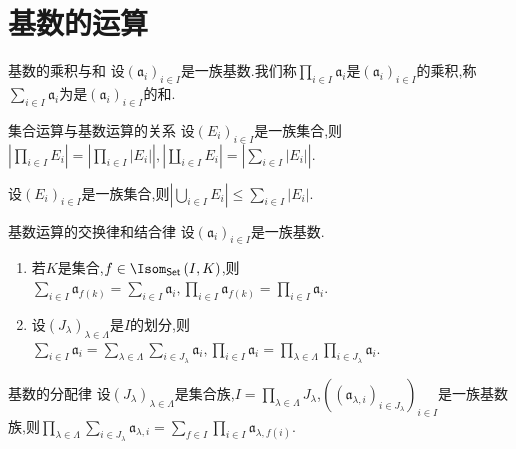 \section{基数的运算}

\begin{definition}{基数的乘积与和}{}
	设$\left(\mathfrak{a}_{i}\right)_{i\in I}$是一族基数.我们称$\prod\limits_{i\in I}\mathfrak{a}_{i}$是$\left(\mathfrak{a}_{i}\right)_{i\in I}$的乘积,称$\sum\limits_{i\in I}\mathfrak{a}_{i}$为是$\left(\mathfrak{a}_{i}\right)_{i\in I}$的和.
\end{definition}

\begin{proposition}{集合运算与基数运算的关系}{}
	设$\left(E_{i}\right)_{i\in I}$是一族集合,则$\left|\prod\limits_{i\in I}E_{i}\right|=\left|\prod\limits_{i\in I}\left|E_{i}\right|\right|,\left|\coprod\limits_{i\in I}E_{i}\right|=\left|\sum\limits_{i\in I}\left|E_{i}\right|\right|$.
\end{proposition}

\begin{corollary}{}{}
	设$\left(E_{i}\right)_{i\in I}$是一族集合,则$\left|\bigcup\limits_{i\in I}E_{i}\right|\leq\sum\limits_{i\in I}\left|E_{i}\right|$.
\end{corollary}

\begin{proposition}{基数运算的交换律和结合律}{}
	设$\left(\mathfrak{a}_{i}\right)_{i\in I}$是一族基数.
	\begin{enumerate}
		\item 若$K$是集合,$f\in\Isom_{\mathsf{Set}}\left(I,K\right)$,则$\sum\limits_{i\in I}\mathfrak{a}_{f\left(k\right)}=\sum\limits_{i\in I}\mathfrak{a}_{i},\prod\limits_{i\in I}\mathfrak{a}_{f\left(k\right)}=\prod\limits_{i\in I}\mathfrak{a}_{i}$.
		\item 设$\left(J_{\lambda}\right)_{\lambda\in\Lambda}$是$I$的划分,则$\sum\limits_{i\in I}\mathfrak{a}_{i}=\sum\limits_{\lambda\in\Lambda}\sum\limits_{i\in J_{\lambda}}\mathfrak{a}_{i},\prod\limits_{i\in I}\mathfrak{a}_{i}=\prod\limits_{\lambda\in\Lambda}\prod\limits_{i\in J_{\lambda}}\mathfrak{a}_{i}$.
	\end{enumerate}
\end{proposition}

\begin{proposition}{基数的分配律}{}
	设$\left(J_{\lambda}\right)_{\lambda\in\Lambda}$是集合族,$I=\prod\limits_{\lambda\in\Lambda}J_{\lambda}$,$\left(\left(\mathfrak{a}_{\lambda,i}\right)_{i\in J_{\lambda}}\right)_{i\in I}$是一族基数族,则$\prod\limits_{\lambda\in\Lambda}\sum\limits_{i\in J_{\lambda}}\mathfrak{a}_{\lambda,i}=\sum\limits_{f\in I}\prod\limits_{i\in I}\mathfrak{a}_{\lambda,f\left(i\right)}$.
\end{proposition}

